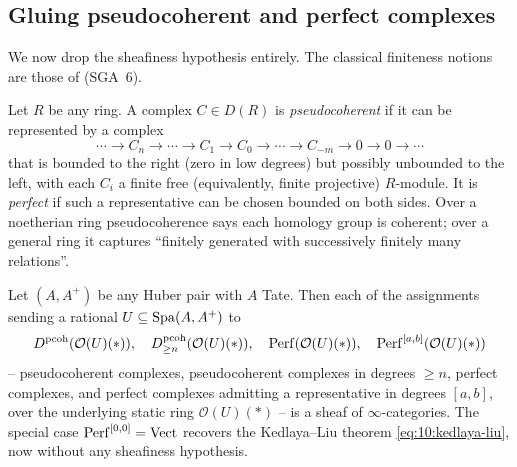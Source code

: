 \subsection{Gluing pseudocoherent and perfect complexes}

We now drop the sheafiness hypothesis entirely. The classical finiteness notions
are those of \cite{Berthelot_1971} (SGA~6).

\begin{definition}
\label{def:10:pseudocoherent}
Let $R$ be any ring. A complex $C\in D(R)$ is \emph{pseudocoherent} if it can be
represented by a complex
\begin{equation*}
\cdots\to C_{n}\to\cdots\to C_{1}\to C_{0}\to\cdots\to C_{-m}\to 0\to 0\to\cdots
\end{equation*}
that is bounded to the right (zero in low degrees) but possibly unbounded to the
left, with each $C_{i}$ a finite free (equivalently, finite projective)
$R$-module. It is \emph{perfect} if such a representative can be chosen bounded on
both sides. Over a noetherian ring pseudocoherence says each homology group is
coherent; over a general ring it captures ``finitely generated with successively
finitely many relations''.
\end{definition}

\begin{theorem}
\label{thm:10:gluing}
Let $(A,A^{+})$ be any Huber pair with $A$ Tate. Then each of the assignments
sending a rational $U\subseteq\operatorname{Spa}(A,A^{+})$ to
\begin{equation}
\label{eq:10:gluing}
D^{\mathrm{pcoh}}(\mathcal O(U)(\ast)),\quad
D^{\mathrm{pcoh}}_{\ge n}(\mathcal O(U)(\ast)),\quad
\operatorname{Perf}(\mathcal O(U)(\ast)),\quad
\operatorname{Perf}^{[a,b]}(\mathcal O(U)(\ast))
\end{equation}
-- pseudocoherent complexes, pseudocoherent complexes in degrees $\ge n$,
perfect complexes, and perfect complexes admitting a representative in degrees
$[a,b]$, over the underlying static ring $\mathcal O(U)(\ast)$ -- is a sheaf of
$\infty$-categories. The special case $\operatorname{Perf}^{[0,0]}=\operatorname{Vect}$ recovers the
Kedlaya--Liu theorem \eqref{eq:10:kedlaya-liu}, now without any sheafiness
hypothesis.
\end{theorem}

